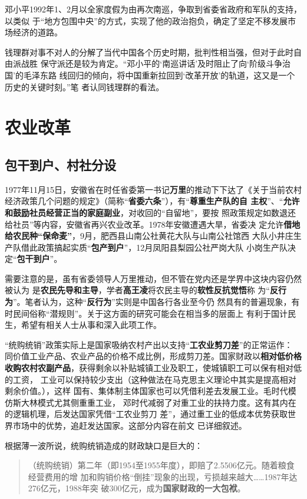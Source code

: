邓小平1992年1、2月以全家度假为由再次南巡，争取到省委省政府和军队的支持，以类似
于“地方包围中央”的方式，实现了他的政治抱负，确定了坚定不移发展市场经济的道路。

钱理群对事不对人的分解了当代中国各个历史时期，批判性相当强，但对于此时自由派战胜
保守派还是较为肯定。“邓小平的‘南巡讲话’及时阻止了向‘阶级斗争治国’的毛泽东路
线回归的倾向，将中国重新拉回到‘改革开放’的轨道，这又是一个历史的关键时刻。”笔
者认同钱理群的看法。

\section{农业改革}

\subsection{包干到户、村社分设}

1977年11月15日，安徽省在时任省委第一书记\textbf{万里}的推动下下达了《关于当前农村
经济政策几个问题的规定》（简称“\textbf{省委六条}”），有“\textbf{尊重生产队的自
  主权}”、“\textbf{允许和鼓励社员经营正当的家庭副业}，对收回的“自留地”，要按
照政策规定如数退还给社员”等内容，安徽省再兴农业改革。1978年安徽遭遇大旱，省委决
定允许\textbf{借地给农民种“保命麦”}，9月，肥西县山南公社黄花大队与山南公社馆西
大队小井庄生产队借此政策搞起实质“\textbf{包产到户}”，12月凤阳县梨园公社严岗大队
小岗生产队决定“\textbf{包干到户}”。

需要注意的是，虽有省委领导人万里推动，但不管在党内还是学界中这块内容仍然被认为
是\textbf{农民先导和主导}，学者\textbf{高王凌}将农民主导的\textbf{软性反抗觉悟}称
为“\textbf{反行为}”。笔者认为，这种“\textbf{反行为}”实则是中国各行各业至今仍
然具有的普遍现象，有时民间俗称“潜规则”。关于这方面的研究可能会在相当多的层面上
有利于国计民生，希望有相关人士从事和深入此项工作。

“统购统销”政策实际上是国家吸纳农村产出以支持“\textbf{工农业剪刀差}”的正常运作：
同价值工业产品、农业产品的价格不成比例，形成剪刀差。国家财政以\textbf{相对低价格
  收购农村农副产品}，获得剩余以补贴城镇工业及职工，使城镇职工可以保有相对低的工资，
工业可以保持较少支出（这种做法在马克思主义理论中其实是提高相对剩余价值。），这样
国有、集体制主体国家也可以凭借利差去发展工业。毛时代模仿斯大林模式尤其侧重重工业，
邓时代减弱了对重工业的扶持力度。这有其内在的逻辑机理，后发达国家凭借“工农业剪刀
差”，通过重工业的低成本优势获取世界市场中的优势，追赶发达国家。这部分内容在前文
已详细叙述。

根据薄一波所说，统购统销造成的财政缺口是巨大的：
\begin{quotation}
  （统购统销）第二年（即1954至1955年度），即赔了2.5506亿元。随着粮食经营费用的增
  加和购销价格“倒挂”现象的出现，亏损越来越大……1987年达276亿元，1988年突
  破300亿元，成为\textbf{国家财政的一大包袱}。
\end{quotation}


